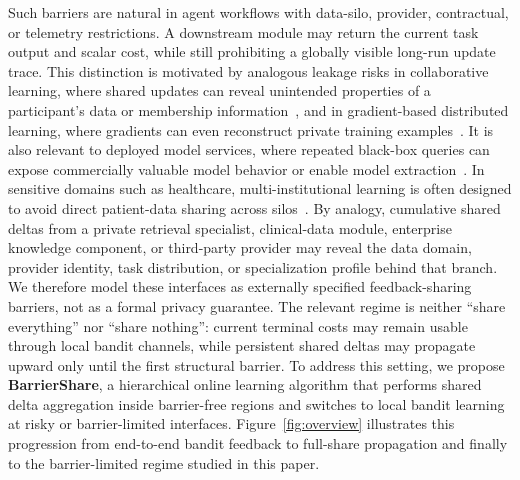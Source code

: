 Such barriers are natural in agent workflows with data-silo, provider, contractual, or telemetry restrictions.
A downstream module may return the current task output and scalar cost, while still prohibiting a globally visible long-run update trace.
This distinction is motivated by analogous leakage risks in collaborative learning, where shared updates can reveal unintended properties of a participant's data or membership information~\cite{melis2019unintended}, and in gradient-based distributed learning, where gradients can even reconstruct private training examples~\cite{zhu2019deep}.
It is also relevant to deployed model services, where repeated black-box queries can expose commercially valuable model behavior or enable model extraction~\cite{tramer2016stealing}.
In sensitive domains such as healthcare, multi-institutional learning is often designed to avoid direct patient-data sharing across silos~\cite{sheller2020federated}.
By analogy, cumulative shared deltas from a private retrieval specialist, clinical-data module, enterprise knowledge component, or third-party provider may reveal the data domain, provider identity, task distribution, or specialization profile behind that branch.
We therefore model these interfaces as externally specified feedback-sharing barriers, not as a formal privacy guarantee.
The relevant regime is neither ``share everything'' nor ``share nothing'': current terminal costs may remain usable through local bandit channels, while persistent shared deltas may propagate upward only until the first structural barrier.
To address this setting, we propose \textbf{BarrierShare}, a hierarchical online learning algorithm that performs shared delta aggregation inside barrier-free regions and switches to local bandit learning at risky or barrier-limited interfaces.
Figure~\ref{fig:overview} illustrates this progression from end-to-end bandit feedback to full-share propagation and finally to the barrier-limited regime studied in this paper.

